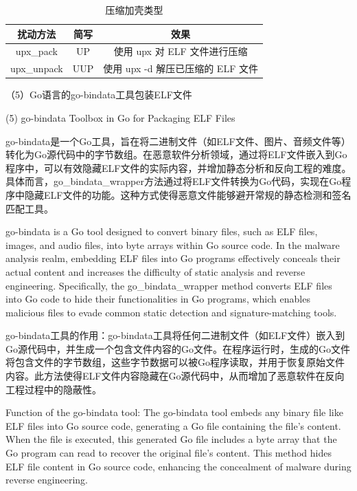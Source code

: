 \begin{table}[htbp]
	\centering
	\caption{压缩加壳类型}\label{tab:4.4}
	\begin{tabular*}{0.9\textwidth}{@{\extracolsep{\fill}}ccc}
		\toprule
		扰动方法 & 简写 & 效果 \\
		\midrule
		upx\_pack & UP & 使用 upx 对 ELF 文件进行压缩 \\
		upx\_unpack & UUP & 使用 upx -d 解压已压缩的 ELF 文件 \\
		\bottomrule
	\end{tabular*}
\end{table}

（5）Go语言的go-bindata工具包装ELF文件

(5) go-bindata Toolbox in Go for Packaging ELF Files

go-bindata是一个Go工具，旨在将二进制文件（如ELF文件、图片、音频文件等）转化为Go源代码中的字节数组。在恶意软件分析领域，通过将ELF文件嵌入到Go程序中，可以有效隐藏ELF文件的实际内容，并增加静态分析和反向工程的难度。具体而言，go\_bindata\_wrapper方法通过将ELF文件转换为Go代码，实现在Go程序中隐藏ELF文件的功能。这种方式使得恶意文件能够避开常规的静态检测和签名匹配工具。

go-bindata is a Go tool designed to convert binary files, such as ELF files, images, and audio files, into byte arrays within Go source code. In the malware analysis realm, embedding ELF files into Go programs effectively conceals their actual content and increases the difficulty of static analysis and reverse engineering. Specifically, the go\_bindata\_wrapper method converts ELF files into Go code to hide their functionalities in Go programs, which enables malicious files to evade common static detection and signature-matching tools.

go-bindata工具的作用：go-bindata工具将任何二进制文件（如ELF文件）嵌入到Go源代码中，并生成一个包含文件内容的Go文件。在程序运行时，生成的Go文件将包含文件的字节数组，这些字节数据可以被Go程序读取，并用于恢复原始文件内容。此方法使得ELF文件内容隐藏在Go源代码中，从而增加了恶意软件在反向工程过程中的隐蔽性。

Function of the go-bindata tool: The go-bindata tool embeds any binary file like ELF files into Go source code, generating a Go file containing the file's content. When the file is executed, this generated Go file includes a byte array that the Go program can read to recover the original file's content. This method hides ELF file content in Go source code, enhancing the concealment of malware during reverse engineering.

